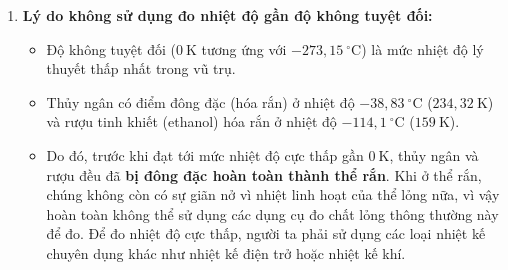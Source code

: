 \begin{vidumau}
{\begin{enumerate}
\begin{itemize}
			\end{itemize}
			\item \textbf{Lý do không sử dụng đo nhiệt độ gần độ không tuyệt đối:}
			\begin{itemize}
				\item Độ không tuyệt đối ($0\ \mathrm{K}$ tương ứng với $-273{,}15\ ^\circ\mathrm{C}$) là mức nhiệt độ lý thuyết thấp nhất trong vũ trụ. 
				\item Thủy ngân có điểm đông đặc (hóa rắn) ở nhiệt độ $-38{,}83\ ^\circ\mathrm{C}$ ($234{,}32\ \mathrm{K}$) và rượu tinh khiết (ethanol) hóa rắn ở nhiệt độ $-114{,}1\ ^\circ\mathrm{C}$ ($159\ \mathrm{K}$). 
				\item Do đó, trước khi đạt tới mức nhiệt độ cực thấp gần $0\ \mathrm{K}$, thủy ngân và rượu đều đã \textbf{bị đông đặc hoàn toàn thành thể rắn}. Khi ở thể rắn, chúng không còn có sự giãn nở vì nhiệt linh hoạt của thể lỏng nữa, vì vậy hoàn toàn không thể sử dụng các dụng cụ đo chất lỏng thông thường này để đo. Để đo nhiệt độ cực thấp, người ta phải sử dụng các loại nhiệt kế chuyên dụng khác như nhiệt kế điện trở hoặc nhiệt kế khí.
			\end{itemize}
		\end{enumerate}
	}
\end{vidumau}

